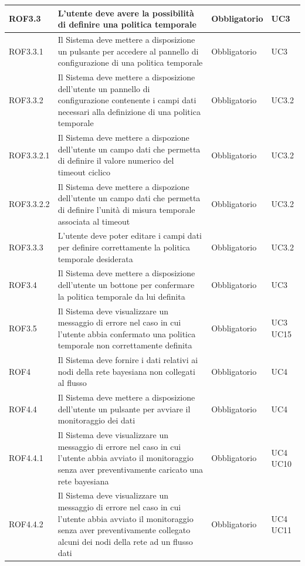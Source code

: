 \begin{center}
\begin{longtable}[c]{|m{}|m{}|m{}|m{}|}
\hline
ROF3.3 & L'utente deve avere la possibilità di definire una politica temporale & Obbligatorio & UC3\\ 
\hline
\rowcolor{grigio}ROF3.3.1 & Il Sistema deve mettere a disposizione un pulsante per accedere al pannello di configurazione di una politica temporale & Obbligatorio & UC3\\
\hline
ROF3.3.2 & Il Sistema deve mettere a disposizione dell'utente un pannello di configurazione contenente i campi dati necessari alla definizione di una politica temporale & Obbligatorio & UC3.2\\
\hline
\rowcolor{grigio}ROF3.3.2.1 & Il Sistema deve mettere a dispozione dell'utente un campo dati che permetta di definire il valore numerico del timeout ciclico & Obbligatorio & UC3.2\\
\hline
ROF3.3.2.2 & Il Sistema deve mettere a dispozione dell'utente un campo dati che permetta di definire l'unità di misura temporale associata al timeout & Obbligatorio & UC3.2\\
\hline
\rowcolor{grigio}ROF3.3.3 & L'utente deve poter editare i campi dati per definire correttamente la politica temporale desiderata & Obbligatorio & UC3.2\\
\hline
ROF3.4 & Il Sistema deve mettere a disposizione dell'utente un bottone per confermare la politica temporale da lui definita & Obbligatorio & UC3\\
\hline
\rowcolor{grigio}ROF3.5 & Il Sistema deve visualizzare un messaggio di errore nel caso in cui l'utente abbia confermato una politica temporale non correttamente definita & Obbligatorio & UC3 UC15\\
\hline
ROF4 & Il Sistema deve fornire i dati relativi ai nodi della rete bayesiana non collegati al flusso & Obbligatorio & UC4\\
\hline
\rowcolor{grigio}ROF4.4 & Il Sistema deve mettere a disposizione dell'utente un pulsante per avviare il monitoraggio dei dati & Obbligatorio & UC4\\
\hline
ROF4.4.1 & Il Sistema deve visualizzare un messaggio di errore nel caso in cui l'utente abbia avviato il monitoraggio senza aver preventivamente caricato una rete bayesiana & Obbligatorio & UC4 UC10\\
\hline
\rowcolor{grigio}ROF4.4.2 & Il Sistema deve visualizzare un messaggio di errore nel caso in cui l'utente abbia avviato il monitoraggio senza aver preventivamente collegato alcuni dei nodi della rete ad un flusso dati & Obbligatorio & UC4 UC11\\

\end{longtable}
\end{center}
